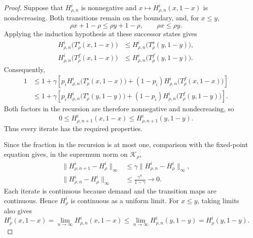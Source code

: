 \documentclass[11pt]{article}
\begin{document}
\begin{proof}
Suppose that $H_{\rho,n}^i$ is nonnegative and
$x\mapsto H_{\rho,n}^i(x,1-x)$ is nondecreasing.
Both transitions remain on the boundary, and, for $x\le y$,
\begin{equation}
\rho x+1-\rho\le\rho y+1-\rho,
\qquad
\rho x\le\rho y.
\end{equation}
Applying the induction hypothesis at these successor states gives
\begin{equation}
\begin{aligned}
H_{\rho,n}^i\bigl(T_\rho^s(x,1-x)\bigr)
&\le H_{\rho,n}^i\bigl(T_\rho^s(y,1-y)\bigr),\\
H_{\rho,n}^i\bigl(T_\rho^f(x,1-x)\bigr)
&\le H_{\rho,n}^i\bigl(T_\rho^f(y,1-y)\bigr).
\end{aligned}
\end{equation}
Consequently,
\begin{equation}
\begin{aligned}
1
&\le
1+\gamma\left[
p_iH_{\rho,n}^i\bigl(T_\rho^s(x,1-x)\bigr)
+(1-p_i)H_{\rho,n}^i\bigl(T_\rho^f(x,1-x)\bigr)
\right]\\
&\le
1+\gamma\left[
p_iH_{\rho,n}^i\bigl(T_\rho^s(y,1-y)\bigr)
+(1-p_i)H_{\rho,n}^i\bigl(T_\rho^f(y,1-y)\bigr)
\right].
\end{aligned}
\end{equation}
Both factors in the recursion are therefore nonnegative and
nondecreasing, so
\begin{equation}
0\le H_{\rho,n+1}^i(x,1-x)
\le H_{\rho,n+1}^i(y,1-y).
\end{equation}
Thus every iterate has the required properties.

Since the fraction in the recursion is at most one, comparison
with the fixed-point equation gives, in the supremum norm on
$\mathcal K_\rho$,
\begin{equation}
\begin{aligned}
\|H_{\rho,n+1}^i-H_\rho^i\|_\infty
&\le\gamma\|H_{\rho,n}^i-H_\rho^i\|_\infty,\\
\|H_{\rho,n}^i-H_\rho^i\|_\infty
&\le\frac{\gamma^n}{1-\gamma}\longrightarrow0.
\end{aligned}
\end{equation}
Each iterate is continuous because demand and the transition maps
are continuous. Hence $H_\rho^i$ is continuous as a uniform limit.
For $x\le y$, taking limits also gives
\begin{equation}
H_\rho^i(x,1-x)
=
\lim_{n\to\infty}H_{\rho,n}^i(x,1-x)
\le
\lim_{n\to\infty}H_{\rho,n}^i(y,1-y)
=
H_\rho^i(y,1-y).
\end{equation}


\end{proof}
\end{document}
